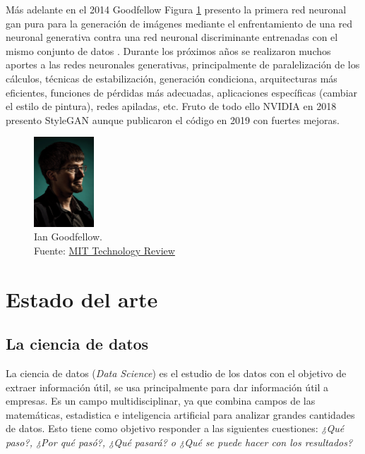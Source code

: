 Más adelante en el 2014 {Goodfellow} Figura \ref{fig:gan-ian-goodfellow} presento la primera red neuronal \acrshort{gan} pura para la generación de imágenes mediante el enfrentamiento de una red neuronal generativa contra una red neuronal discriminante entrenadas con el mismo conjunto de datos \cite{goodfellow2014generative}.
Durante los próximos años se realizaron muchos aportes a las redes neuronales generativas, principalmente de paralelización de los cálculos, técnicas de estabilización, generación condiciona, arquitecturas más eficientes, funciones de pérdidas más adecuadas, aplicaciones específicas (cambiar el estilo de pintura), redes apiladas, etc.
Fruto de todo ello {NVIDIA} en 2018 presento \gls{StyleGAN} \cite{karras2019stylebased} aunque publicaron el código en 2019 con fuertes mejoras.

\begin{figure}[H]
    \centering
    \includegraphics[width=0.2\textwidth]{figures/gan-goodfellow.png}
    \caption{Ian Goodfellow.\\Fuente: \href{https://www.technologyreview.es/s/10016/el-senor-de-las-gan-el-hombre-que-dio-imaginacion-las-maquinas}{MIT Technology Review}}
    \label{fig:gan-ian-goodfellow}
\end{figure}


\section{Estado del arte}
\label{ch:2:section:state-of-the-art}

\subsection{La ciencia de datos}
La ciencia de datos (\textit{Data Science}) es el estudio de los datos con el objetivo de extraer información útil, se usa principalmente para dar información útil a empresas. Es un campo multidisciplinar, ya que combina campos de las matemáticas, estadistica e inteligencia artificial para analizar grandes cantidades de datos. Esto tiene como objetivo responder a las siguientes cuestiones: \textit{¿Qué paso?, ¿Por qué pasó?, ¿Qué pasará? o ¿Qué se puede hacer con los resultados?} \cite{aws-data-science}

